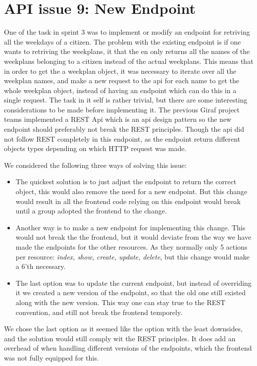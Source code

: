\section{API issue 9: New Endpoint} \label{sec:webIssue9}

One of the task in sprint 3 was to implement or modify an endpoint for retriving all the weekdays of a citizen. The problem with the existing endpoint is if one wants to retriving the weekplans, it that the en only returns all the names of the weekplans belonging to a citizen instead of the actual weekplans. This means that in order to get the a weekplan object, it was necessary to iterate over all the weekplan names, and make a new request to the api for each name to get the whole weekplan object, instead of having an endpoint which can do this in a single request. 
The task in it self is rather trivial, but there are some interesting considerations to be made before implementing it. The previous Giraf project teams implemented a REST Api which is an \gls{api} design pattern so the new endpoint should preferably not break the REST principles. Though the \gls{api} did not follow REST completely in this endpoint, as the endpoint return different objects types depending on which HTTP request was made. 

We considered the following three ways of solving this issue:
\begin{itemize}
\item The quickest solution is to just adjust the endpoint to return the correct object, this would also remove the need for a new endpoint. But this change would result in all the frontend code relying on this endpoint would break until a group adopted the frontend to the change.
\item Another way is to make a new endpoint for implementing this change. This would not break the the frontend, but it would deviate from the way we have made the endpoints for the other resources. As they normally only 5 actions per resource: \textit{index, show, create, update, delete}, but this change would make a 6'th necessary.
\item The last option was to update the current endpoint, but instead of overriding it we created a new version of the endpoint, so that the old one still existed along with the new version. This way one can stay true to the REST convention, and still not break the frontend temporely.
\end{itemize}

We chose the last option as it seemed like the option with the least downsides, and the solution would still comply wit the REST principles. It does add an overhead of when handling different versions of the endpoints, which the frontend was not fully equipped for this.